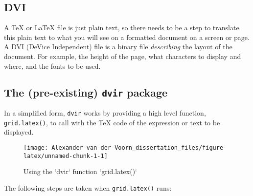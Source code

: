 \documentclass[]{article}
\newenvironment{Shaded}{\begin{snugshade}}{\end{snugshade}}
\newcommand{\KeywordTok}[1]{\textcolor[rgb]{0.13,0.29,0.53}{\textbf{#1}}}
\newcommand{\CharTok}[1]{\textcolor[rgb]{0.31,0.60,0.02}{#1}}
\newcommand{\StringTok}[1]{\textcolor[rgb]{0.31,0.60,0.02}{#1}}
\newcommand{\NormalTok}[1]{#1}
\begin{document}
\subsection{DVI}\label{dvi}

A \TeX{} or \LaTeX{} file is just plain text, so there needs to be a
step to translate this plain text to what you will see on a formatted
document on a screen or page. A DVI (DeVice Independent) file is a
binary file \emph{describing} the layout of the document. For example,
the height of the page, what characters to display and where, and the
fonts to be used.

\subsection{\texorpdfstring{The (pre-existing) \texttt{dvir}
package}{The (pre-existing) dvir package}}\label{dvirDesc}

In a simplified form, \texttt{dvir} works by providing a high level
function, \texttt{grid.latex()}, to call with the \TeX{} code of the
expression or text to be displayed.

\begin{Shaded}
\end{Shaded}

\begin{figure}

{\centering \texttt{[image: Alexander-van-der-Voorn\_dissertation\_files/figure-latex/unnamed-chunk-1-1]} 

}

\caption{Using the `dvir` function `grid.latex()`}\label{fig:unnamed-chunk-1}
\end{figure}

The following steps are taken when \texttt{grid.latex()} runs:
\end{document}
